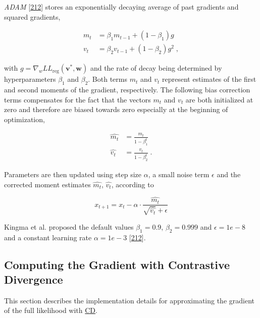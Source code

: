\documentclass[11pt,a4paper,twoside]{book}
\newcommand{\LLreg}{L\!L_\mathrm{reg}}
\renewcommand{\v}{\mathbf{v}}
\newcommand{\w}{\mathbf{w}}
\theoremstyle{definition}
\theoremstyle{definition}
\theoremstyle{remark}
\begin{document}
\emph{ADAM} {[}\protect\hyperlink{ref-Kingma2014}{212}{]} stores an
exponentially decaying average of past gradients and squared gradients,

\begin{align}
  m_t &= \beta_1 m_{t−1} + (1 − \beta_1) g \\
  v_t &= \beta_2 v_{t−1} + (1 − \beta_2) g^2 \; ,
\end{align}

with \(g = \nabla_w \LLreg(\v^*,\w)\) and the rate of decay being
determined by hyperparameters \(\beta_1\) and \(\beta_2\). Both terms
\(m_t\) and \(v_t\) represent estimates of the first and second moments
of the gradient, respectively. The following bias correction terms
compensates for the fact that the vectors \(m_t\) and \(v_t\) are both
initialized at zero and therefore are biased towards zero especially at
the beginning of optimization,

\begin{align}
  \hat{m_t} &= \frac{m_t}{1-\beta_1^t} \\
  \hat{v_t} &= \frac{v_t}{1-\beta_2^t} \; .
\end{align}

Parameters are then updated using step size \(\alpha\), a small noise
term \(\epsilon\) and the corrected moment estimates \(\hat{m_t}\),
\(\hat{v_t}\), according to

\begin{equation}
  x_{t+1} = x_t - \alpha \cdot \frac{\hat{m_t}}{\sqrt{\hat{v_t}} + \epsilon}
\end{equation}

Kingma et al. proposed the default values \(\beta_1=0.9\),
\(\beta_2=0.999\) and \(\epsilon=1e−8\) and a constant learning rate
\(\alpha=1e-3\) {[}\protect\hyperlink{ref-Kingma2014}{212}{]}.

\subsection{Computing the Gradient with Contrastive
Divergence}\label{methods-cd-sampling}

This section describes the implementation details for approximating the
gradient of the full likelihood with \protect\hyperlink{abbrev}{CD}.
\end{document}
